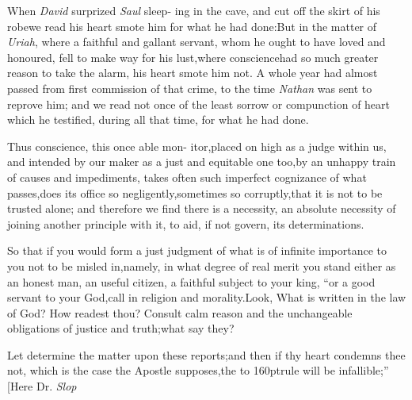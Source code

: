 \documentclass{article}
\begin{document}
\vspace\parskip
\begin{story}{When \textit{David} surprized \textit{Saul} sleep-}
    ing in the cave, and cut off the skirt of his robe\tsk we
    read his heart smote him for what he had done:\tsh But in\break
    the matter of \textit{Uriah}, where a faithful and gallant
    servant, whom he ought to have loved and honoured, fell to
    make way for his lust,\tsk where conscience\pb had so much
    greater reason to take the alarm, his heart smote him
    not.\break
    A whole year had almost passed from first commission of that
    crime, to the time \textit{Nathan} was sent to reprove him;
    and we read not once of the least sorrow or compunction of
    heart which he testified, during all that time, for what he
    had done.
\end{story}
\vspace\parskip
\begin{story}{Thus conscience, this once able mon-}
    itor,\tsh placed on high as a judge within us, and
intended by our maker as a just and equitable one too,\tsk by an
unhappy train of causes and impediments, takes often such imperfect
cognizance of what passes,\tsh does its office so
negligently,\tsh sometimes so corruptly,\tsk that it is
not to be trusted alone; and therefore we find there is\break
    a necessity, an absolute necessity of\pb
    joining another principle with
it, to aid, if not govern, its determinations.
\end{story}
\vspace\parskip
\begin{story}{So that if you would form a just}
    judgment of what is of infinite importance to you not to be
    misled in,\tsh\break namely, in what degree of real merit
    you stand either as an honest man, an useful citizen, a
    faithful subject to your king, “or a good servant to your
    God,\tsk\break call in religion and morality.\tsk Look, 
    \tsk What is written in the law of God?\break
    \tsh How readest thou?\tsk
    Consult calm reason and the unchangeable ob\-ligations of
    justice and truth;\tsh what say they?
\end{story}
\vspace\parskip
\begin{story}{Let  determine the}
    matter
upon these reports;\tsh and then if thy heart condemns
thee not, which is the case the Apostle supposes,\tsh the\pb
    \hbox to 160pt{rule will be infallible;” [Here Dr.\@
    \textit{Slop}}
\end{story}
\end{document}
